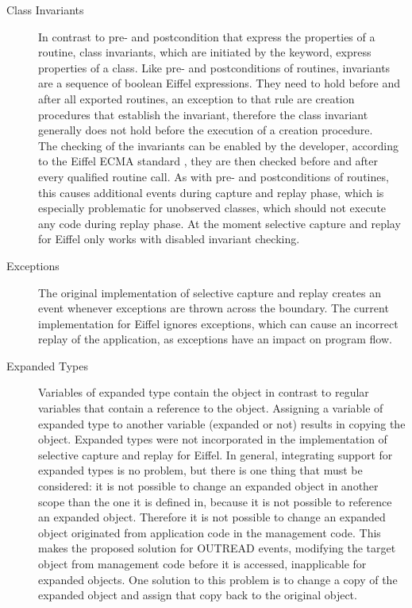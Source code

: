 \begin{description}
 \item [Class Invariants] In contrast to pre- and postcondition that express the properties of a routine, class invariants, which are initiated by the  keyword, express properties of a class. Like pre- and postconditions of routines, invariants are a sequence of boolean Eiffel expressions. They need to hold before and after all exported routines, an exception to that rule are creation procedures that establish the invariant, therefore the class invariant generally does not hold before the execution of a creation procedure.\\
The checking of the invariants can be enabled by the developer, according to the Eiffel ECMA standard \cite{Eiffel-ECMA}, they are then checked before and after every qualified routine call. As with pre- and postconditions of routines, this causes additional events during capture and replay phase, which is especially problematic for unobserved classes, which should not execute any code during replay phase. At the moment selective capture and replay for Eiffel only works with disabled invariant checking.

 \item [Exceptions] The original implementation of selective capture and replay creates an event whenever exceptions are thrown across the boundary. The current implementation for Eiffel ignores exceptions, which can cause an incorrect replay of the application, as exceptions have an impact on program flow. %

 \item [Expanded Types] Variables of expanded type contain the object in contrast to regular variables that contain a reference to the object. Assigning a variable of expanded type to another variable (expanded or not) results in copying the object. Expanded types were not incorporated in the implementation of selective capture and replay for Eiffel. In general, integrating support for expanded types is no problem, but there is one thing that must be considered: it is not possible to change an expanded object in another scope than the one it is defined in, because it is not possible to reference an expanded object. Therefore it is not possible to change an expanded object originated from application code in the management code. This makes the proposed solution for OUTREAD events, modifying the target object from management code before it is accessed, inapplicable for expanded objects. One solution to this problem is to change a copy of the expanded object and assign that copy back to the original object.


\end{description}
